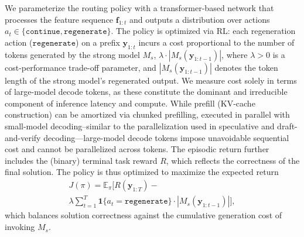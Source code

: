 \documentclass{article}
\theoremstyle{plain}
\theoremstyle{definition}
\theoremstyle{remark}
\newcommand{\cont}{\mathtt{continue}}
\newcommand{\regen}{\mathtt{regenerate}}
\newcommand{\y}{\mathbf{y}}
\begin{document}
We parameterize the routing policy with a transformer-based network that processes the feature sequence $\mathbf{f}_{1:t}$ and outputs a distribution over actions $a_t \in \{\cont, \regen\}$. The policy is optimized via RL: each regeneration action ($\regen$) on a prefix $\mathbf{y}_{1:t}$ incurs a cost proportional to the number of tokens generated by the strong model $M_s$, $\lambda \cdot |M_s(\mathbf{y}_{1:t-1})|$, where $\lambda > 0$ is a cost-performance trade-off parameter, and $|M_s(\mathbf{y}_{1:t-1})|$ denotes the token length of the strong model’s regenerated output. We measure cost solely in terms of large-model decode tokens, as these constitute the dominant and irreducible component of inference latency and compute.  While prefill (KV-cache construction) can be amortized via chunked prefilling, executed in parallel with small-model decoding--similar to the parallelization used in speculative and draft-and-verify decoding—large-model decode tokens impose unavoidable sequential cost and cannot be parallelized across tokens.
The episodic return further includes the (binary) terminal task reward $R$, which reflects the correctness of the final solution.  The policy is thus optimized to maximize the expected return
\begin{multline*}
J(\pi)
= \mathbb{E}_{\pi}\!\big[ 
R(\y_{1:T})
- \\ \lambda \sum_{t=1}^T
\mathbf{1}\{a_t=\regen\}
\cdot |M_s(\y_{1:t-1})|
\big],
\end{multline*}
which balances solution correctness against the cumulative generation cost of invoking $M_s$.
\end{document}
